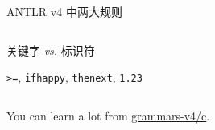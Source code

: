 \begin{frame}{}
  \begin{center}
    ANTLR v4 中两大规则

    \vspace{1.20cm}
	\begin{columns}[]
	  \begin{description}
		\setlength{\itemsep}{15pt}
		\item[最前优先匹配:] 关键字 \emph{vs.} 标识符
		\item[最长优先匹配:] \texttt{>=}, \texttt{ifhappy}, \texttt{thenext}, \texttt{1.23}
	  \end{description}
	\end{columns}
  \end{center}
\end{frame}

\begin{frame}{}
  \begin{center}
    You can learn a lot from \href{https://github.com/antlr/grammars-v4/tree/master/c}{grammars-v4/c}.
  \end{center}
\end{frame}
